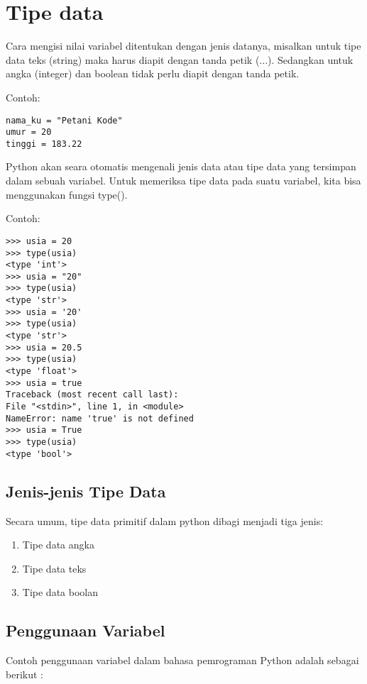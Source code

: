 \section{Tipe data}
Cara mengisi nilai variabel ditentukan dengan jenis datanya, misalkan untuk tipe data teks (string) maka harus diapit dengan tanda petik (...). Sedangkan untuk angka (integer) dan boolean tidak perlu diapit dengan tanda petik.

Contoh:

\begin{verbatim}
nama_ku = "Petani Kode"
umur = 20
tinggi = 183.22
\end{verbatim}

Python akan seara otomatis mengenali jenis data atau tipe data yang tersimpan dalam sebuah variabel. Untuk memeriksa tipe data pada suatu variabel, kita bisa menggunakan fungsi type().

Contoh:

\begin{verbatim}
>>> usia = 20
>>> type(usia)
<type 'int'>
>>> usia = "20"
>>> type(usia)
<type 'str'>
>>> usia = '20'
>>> type(usia)
<type 'str'>
>>> usia = 20.5
>>> type(usia)
<type 'float'>
>>> usia = true
Traceback (most recent call last):
File "<stdin>", line 1, in <module>
NameError: name 'true' is not defined
>>> usia = True
>>> type(usia)
<type 'bool'>
\end{verbatim}

\subsection{Jenis-jenis Tipe Data}

Secara umum, tipe data primitif dalam python dibagi menjadi tiga jenis:

\begin{enumerate}
\item Tipe data angka
\item Tipe data teks
\item Tipe data boolan
\end{enumerate}

\subsection{Penggunaan Variabel}
Contoh penggunaan variabel  dalam bahasa pemrograman Python adalah sebagai berikut :

